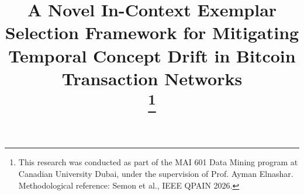 \documentclass[conference]{IEEEtran}
\begin{document}
\title{A Novel In-Context Exemplar Selection Framework for Mitigating Temporal Concept Drift in Bitcoin Transaction Networks\\
\thanks{This research was conducted as part of the MAI 601 Data Mining program at Canadian University Dubai, under the supervision of Prof. Ayman Elnashar. Methodological reference: Semon et al., IEEE QPAIN 2026.}
}

\author{
\and
{}
}

\maketitle
\end{document}
